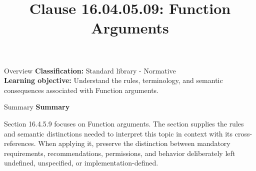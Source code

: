 \documentclass[10pt,letterpaper]{article}
\title{Clause 16.04.05.09: Function Arguments}
\author{}
\date{}
\begin{document}
\maketitle
\begin{CornellOverviewBox}{Overview}
\textbf{Classification:} Standard library - Normative\\[2pt]
\textbf{Learning objective:} Understand the rules, terminology, and semantic consequences associated with Function arguments.
\end{CornellOverviewBox}\begin{CornellSummaryBox}{Summary}
{\sffamily\bfseries\color{Accent} Summary}\par\vspace{3pt}Section 16.4.5.9 focuses on Function arguments. The section supplies the rules and semantic distinctions needed to interpret this topic in context with its cross-references. When applying it, preserve the distinction between mandatory requirements, recommendations, permissions, and behavior deliberately left undefined, unspecified, or implementation-defined.
\end{CornellSummaryBox}
\end{document}
